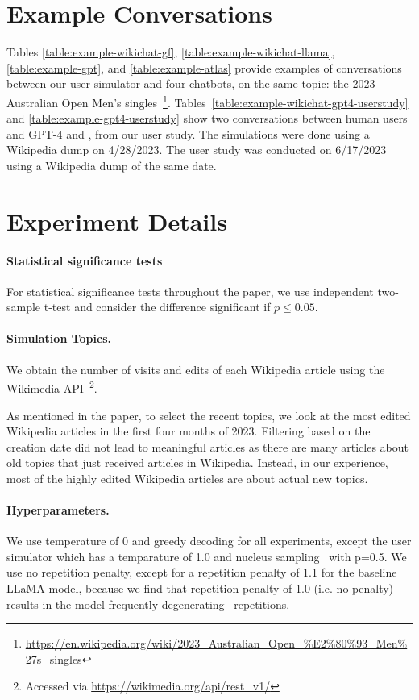 \section{Example Conversations}
\label{sec:example-dialogs}
Tables \ref{table:example-wikichat-gf}, \ref{table:example-wikichat-llama}, \ref{table:example-gpt}, and \ref{table:example-atlas} provide examples of conversations between our user simulator and four chatbots, on the same topic: the 2023 Australian Open Men's singles~\footnote{\url{https://en.wikipedia.org/wiki/2023_Australian_Open_\%E2\%80\%93_Men\%27s_singles}}.
Tables~\ref{table:example-wikichat-gpt4-userstudy} and \ref{table:example-gpt4-userstudy} show two conversations between human users and GPT-4 and \systemgf, from our user study.
The simulations were done using a Wikipedia dump on 4/28/2023.
The user study was conducted on 6/17/2023 using a Wikipedia dump of the same date.




\section{Experiment Details}

\paragraph{Statistical significance tests}
For statistical significance tests throughout the paper, we use independent two-sample t-test and consider the difference significant if $p \leq 0.05$.

\paragraph{Simulation Topics.}
We obtain the number of visits and edits of each Wikipedia article using the Wikimedia API~\footnote{Accessed via \url{https://wikimedia.org/api/rest_v1/}}.

As mentioned in the paper, to select the recent topics, we look at the most edited Wikipedia
articles in the first four months of 2023.
Filtering based on the creation date did not lead to meaningful articles as there are many articles about old topics that just received articles in Wikipedia. Instead, in our experience, most of the highly edited Wikipedia articles are about actual new topics.

\paragraph{Hyperparameters.}
\label{appendix:hyperparameters}
We use temperature of 0 and greedy decoding for all experiments, except the user simulator which has a temparature of 1.0 and nucleus sampling~\cite{degeneration2019} with p=0.5.
We use no repetition penalty, except for a repetition penalty of 1.1 for the baseline LLaMA model, because we find that repetition penalty of 1.0 (i.e. no penalty) results in the model frequently degenerating~\cite{degeneration2019} repetitions.

